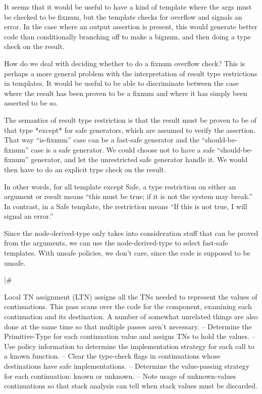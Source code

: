 It seems that it would be useful to have a kind of template where the args must
be checked to be fixnum, but the template checks for overflow and signals an
error.  In the case where an output assertion is present, this would generate
better code than conditionally branching off to make a bignum, and then doing a
type check on the result.

    How do we deal with deciding whether to do a fixnum overflow check?  This
    is perhaps a more general problem with the interpretation of result type
    restrictions in templates.  It would be useful to be able to discriminate
    between the case where the result has been proven to be a fixnum and where
    it has simply been asserted to be so.

    The semantics of result type restriction is that the result must be proven
    to be of that type *except* for safe generators, which are assumed to
    verify the assertion.  That way ``is-fixnum'' case can be a fast-safe
    generator and the ``should-be-fixnum'' case is a safe generator.  We could
    choose not to have a safe ``should-be-fixnum'' generator, and let the
    unrestricted safe generator handle it.  We would then have to do an
    explicit type check on the result.

    In other words, for all template except Safe, a type restriction on either
    an argument or result means ``this must be true; if it is not the system may
    break.''  In contrast, in a Safe template, the restriction means ``If this is
    not true, I will signal an error.''

    Since the node-derived-type only takes into consideration stuff that can be
    proved from the arguments, we can use the node-derived-type to select
    fast-safe templates.  With unsafe policies, we don't care, since the code
    is supposed to be unsafe.

|\#

Local TN assignment (LTN) assigns all the TNs needed to represent the values of
continuations.  This pass scans over the code for the component, examining each
continuation and its destination.  A number of somewhat unrelated things are
also done at the same time so that multiple passes aren't necessary.
 -- Determine the Primitive-Type for each continuation value and assigns TNs
    to hold the values.
 -- Use policy information to determine the implementation strategy for each
    call to a known function.
 -- Clear the type-check flags in continuations whose destinations have safe
    implementations.
 -- Determine the value-passing strategy for each continuation: known or
    unknown.
 -- Note usage of unknown-values continuations so that stack analysis can tell
    when stack values must be discarded.
 

